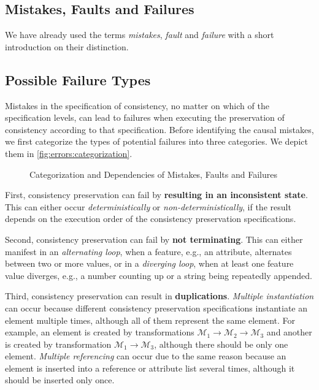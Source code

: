 \subsection{Mistakes, Faults and Failures}

We have already used the terms \emph{mistakes}, \emph{fault} and \emph{failure} with a short introduction on their distinction.



\subsection{Possible Failure Types}
\label{chap:errors:categorization:failures}

Mistakes in the specification of consistency, no matter on which of the specification levels, %
can lead to failures when executing the preservation of consistency according to that specification. %
Before identifying the causal mistakes, we first categorize the types of potential failures into three categories. We depict them in \autoref{fig:errors:categorization}.

\begin{figure}
    \centering
    
    \caption{Categorization and Dependencies of Mistakes, Faults and Failures}
    \label{fig:errors:categorization}
\end{figure}

First, consistency preservation can fail by \textbf{resulting in an inconsistent state}. This can either occur \emph{deterministically} or \emph{non-deterministically}, if the result depends on the execution order of the consistency preservation specifications.

Second, consistency preservation can fail by \textbf{not terminating}. This can either manifest in an \emph{alternating loop}, when a feature, e.g., an attribute, alternates between two or more values, or in a \emph{diverging loop}, when at least one feature value diverges, e.g., a number counting up or a string being repeatedly appended.

Third, consistency preservation can result in \textbf{duplications}. \emph{Multiple instantiation} can occur because different consistency preservation specifications instantiate an element multiple times, although all of them represent the same element. %
For example, an element is created by transformations $\mathcal{M}_1 \rightarrow \mathcal{M}_2 \rightarrow \mathcal{M}_3$ and another is created by transformation $\mathcal{M}_1 \rightarrow \mathcal{M}_3$, although there should be only one element.
\emph{Multiple referencing} can occur due to the same reason because an element is inserted into a reference or attribute list several times, although it should be inserted only once. 


